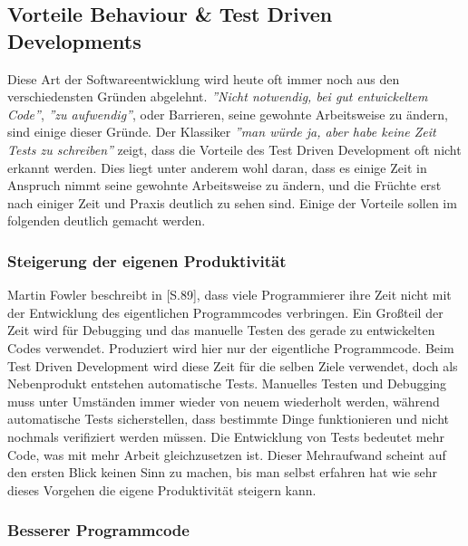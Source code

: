 \subsection{Vorteile Behaviour \& Test Driven Developments}

Diese Art der Softwareentwicklung wird heute oft immer noch aus den
verschiedensten Gründen abgelehnt. \textit{''Nicht notwendig, bei gut
  entwickeltem Code''}, \textit{''zu aufwendig''}, oder Barrieren,
seine gewohnte Arbeitsweise zu ändern, sind einige dieser Gründe. Der
Klassiker \textit{''man würde ja, aber habe keine Zeit Tests zu
  schreiben''} zeigt, dass die Vorteile des Test Driven Development
oft nicht erkannt werden. Dies liegt unter anderem wohl daran, dass es
einige Zeit in Anspruch nimmt seine gewohnte Arbeitsweise zu ändern,
und die Früchte erst nach einiger Zeit und Praxis deutlich zu sehen
sind. Einige der Vorteile sollen im folgenden deutlich gemacht werden.

\subsubsection{Steigerung der eigenen Produktivität}

Martin Fowler beschreibt in \cite{Fowler1999}[S.89], dass viele
Programmierer ihre Zeit nicht mit der Entwicklung des eigentlichen
Programmcodes verbringen. Ein Großteil der Zeit wird für Debugging und
das manuelle Testen des gerade zu entwickelten Codes
verwendet. Produziert wird hier nur der eigentliche Programmcode. Beim
Test Driven Development wird diese Zeit für die selben Ziele
verwendet, doch als Nebenprodukt entstehen automatische
Tests. Manuelles Testen und Debugging muss unter Umständen immer
wieder von neuem wiederholt werden, während automatische Tests
sicherstellen, dass bestimmte Dinge funktionieren und nicht nochmals
verifiziert werden müssen. Die Entwicklung von Tests bedeutet mehr
Code, was mit mehr Arbeit gleichzusetzen ist. Dieser Mehraufwand
scheint auf den ersten Blick keinen Sinn zu machen, bis man selbst
erfahren hat wie sehr dieses Vorgehen die eigene Produktivität
steigern kann.

\subsubsection{Besserer Programmcode}

